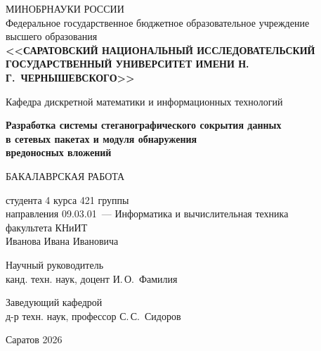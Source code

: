 \thispagestyle{empty}

\begin{center}
  МИНОБРНАУКИ РОССИИ\\
  Федеральное государственное бюджетное образовательное учреждение\\
  высшего образования\\
  \textbf{<<САРАТОВСКИЙ НАЦИОНАЛЬНЫЙ ИССЛЕДОВАТЕЛЬСКИЙ\\
  ГОСУДАРСТВЕННЫЙ УНИВЕРСИТЕТ ИМЕНИ Н.\,Г.~ЧЕРНЫШЕВСКОГО>>}
\end{center}

\vspace{2em}

\begin{center}
  Кафедра дискретной математики и информационных технологий
\end{center}

\vspace{2em}

\begin{center}
  \textbf{Разработка системы стеганографического сокрытия данных\\
  в сетевых пакетах и модуля обнаружения\\
  вредоносных вложений}

  \vspace{1em}
  БАКАЛАВРСКАЯ РАБОТА
\end{center}

\vspace{3em}

\noindent
студента 4 курса 421 группы\\
направления 09.03.01~--- Информатика и вычислительная техника\\
факультета КНиИТ\\
Иванова Ивана Ивановича

\vfill

\noindent
Научный руководитель\\
канд. техн. наук, доцент \hfill \underline{\hspace{4cm}} \hfill И.\,О.~Фамилия

\vspace{1.5em}

\noindent
Заведующий кафедрой\\
д-р техн. наук, профессор \hfill \underline{\hspace{4cm}} \hfill С.\,С.~Сидоров

\vfill

\begin{center}
  Саратов 2026
\end{center}